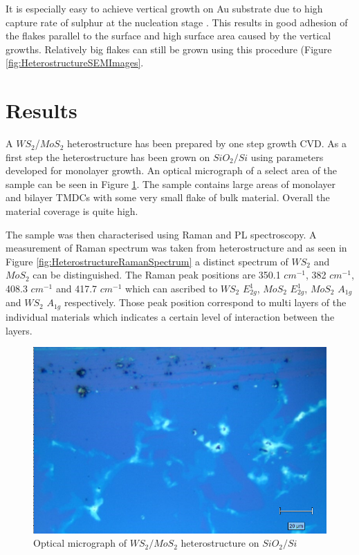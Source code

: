 It is especially easy to achieve vertical growth on Au substrate due to high capture rate of sulphur at the nucleation stage \cite{Gao2015}. This results in good adhesion of the flakes parallel to the surface and high surface area caused by the vertical growths. Relatively big flakes can still be grown using this procedure (Figure \ref{fig:HeterostructureSEMImages}.

\section{Results}

A $WS_2$/$MoS_2$ heterostructure has been prepared by one step growth CVD. As a first step the heterostructure has been grown on $SiO_2/Si$ using parameters developed for monolayer growth. An optical micrograph of a select area of the sample can be seen in Figure \ref{fig:HeterostructureOMSi}. The sample contains large areas of monolayer and bilayer TMDCs with some very small flake of bulk material. Overall the material coverage is quite high.

The sample was then characterised using Raman and PL spectroscopy. A measurement of Raman spectrum was taken from heterostructure and as seen in Figure \ref{fig:HeterostructureRamanSpectrum} a distinct spectrum of $WS_2$ and $MoS_2$ can be distinguished. The Raman peak positions are 350.1 $cm^{-1}$, 382 $cm^{-1}$, 408.3 $cm^{-1}$ and 417.7 $cm^{-1}$ which can ascribed to $WS_2$ $E^1_{2g}$, $MoS_2$ $E^1_{2g}$, $MoS_2$ $A_{1g}$ and $WS_2$ $A_{1g}$ respectively. Those peak position correspond to multi layers of the individual materials which indicates a certain level of interaction between the layers.

\begin{figure}[H]
	\begin{center}
		\includegraphics[scale=0.5]{Heterostructures/OmSi.png}
		\caption{Optical micrograph of $WS_2/MoS_2$ heterostructure on $SiO_2/Si$}
		\label{fig:HeterostructureOMSi}
	\end{center}
\end{figure}

